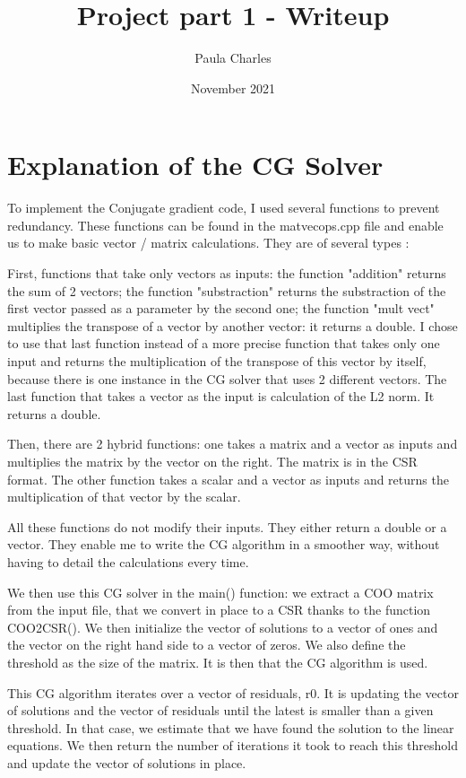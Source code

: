 \documentclass{article}
\title{Project part 1 - Writeup}
\author{Paula Charles}
\date{November 2021}
\begin{document}
\maketitle

\section{Explanation of the CG Solver}

To implement the Conjugate gradient code, I used several 
functions to prevent redundancy. These functions can be found
 in the matvecops.cpp file and enable us to 
make basic vector / matrix calculations. They are of several types :

First, functions that take only vectors as inputs: the 
function "addition" returns the sum of 2 vectors; the 
function "substraction" returns the substraction of the 
first vector passed as a parameter by the second one; the
function "mult vect" multiplies the transpose of a vector 
by another vector: it returns a double. I chose to use that 
last function instead of a more precise function that 
takes only one input and returns the multiplication of 
the transpose of this vector by itself, because there is 
one instance in the CG solver that uses 2 different vectors. 
The last function that takes a vector as the input is 
calculation of the L2 norm. It returns a double.

Then, there are 2 hybrid functions: one takes a matrix and a
 vector as inputs and multiplies the matrix by the vector 
on the right. The matrix is in the CSR format. The other 
function takes a scalar and a vector as inputs and returns 
the multiplication of that vector by the scalar.

All these functions do not modify their inputs. They either 
return a double or a vector. They enable me to write the 
CG algorithm in a smoother way, without having to detail 
the calculations every time.

We then use this CG solver in the main() function: we 
extract a COO matrix from the input file, that we convert 
in place to a CSR thanks to the function COO2CSR(). We then 
initialize the vector of solutions to a vector of ones and 
the vector on the right hand side to a vector of zeros. 
We also define the threshold as the size of the matrix. 
It is then that the CG algorithm is used.

This CG algorithm iterates over a vector of residuals, r0. 
It is updating the vector of solutions and the vector 
of residuals until the latest is smaller than a given threshold. In 
that case, we estimate that we have found the 
solution to the linear equations. We then return the number 
of iterations it took to reach this threshold and update 
the vector of solutions in place.
\end{document}
